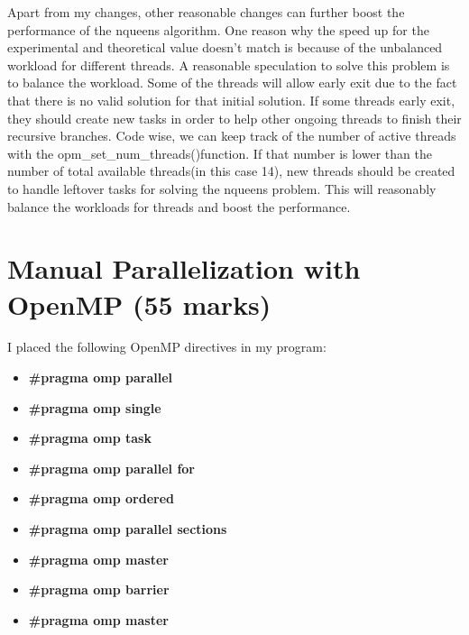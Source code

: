 \documentclass[12pt]{article}
\begin{document}
\indent
Apart from my changes, other reasonable changes can further boost the performance of the nqueens algorithm. One reason why the speed up for the experimental and theoretical value doesn't match is because of the unbalanced workload for different threads. A reasonable speculation to solve this problem is to balance the workload. Some of the threads will allow early exit due to the fact that there is no valid solution for that initial solution. If some threads early exit, they should create new tasks in order to help other ongoing threads to finish their recursive branches. Code wise, we can keep track of the number of active threads with the opm\_set\_num\_threads()function. If that number is lower than the number of total available threads(in this case 14), new threads should be created to handle leftover tasks for solving the nqueens problem. This will reasonably balance the workloads for threads and boost the performance.   \\



\newpage
\section*{Manual Parallelization with OpenMP (55 marks)}

I placed the following OpenMP directives in my program:
\begin{itemize}
  \item \textbf{\#pragma omp parallel}
  \item \textbf{\#pragma omp single}
  \item \textbf{\#pragma omp task}
  \item \textbf{\#pragma omp parallel for}
  \item \textbf{\#pragma omp ordered}
  \item \textbf{\#pragma omp parallel sections}
  \item \textbf{\#pragma omp master}
  \item \textbf{\#pragma omp barrier}
  \item \textbf{\#pragma omp master}
\end{itemize}
\end{document}

